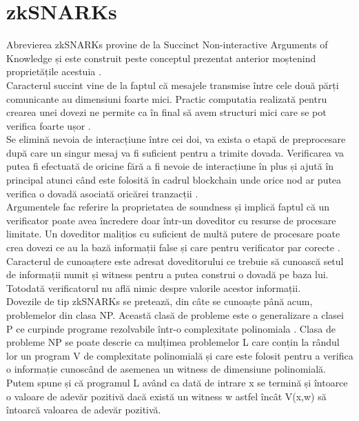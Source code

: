 \section{zkSNARKs}

Abrevierea zkSNARKs provine de la Succinct Non-interactive Arguments of Knowledge și este construit peste conceptul prezentat anterior moștenind proprietățile acestuia \cite{ZKS_Crypto_Basic2}.\\

Caracterul succint vine de la faptul că mesajele transmise între cele două părți comunicante au dimensiuni foarte mici. Practic computatia realizată pentru crearea unei dovezi ne permite ca în final să avem structuri mici care se pot verifica foarte ușor \cite{ZKS_Crypto_Basic2}. \\

Se elimină nevoia de interacțiune între cei doi, va exista o etapă de preprocesare după care un singur mesaj va fi suficient pentru a trimite dovada. Verificarea va putea fi efectuată de oricine fără a fi nevoie de interacțiune în plus și ajută în principal atunci când este folosită în cadrul blockchain unde orice nod ar putea verifica o dovadă asociată oricărei tranzacții \cite{ZKS_Crypto_Basic2}.\\

Argumentele fac referire la proprietatea de soundness și implică faptul că un verificator poate avea încredere doar într-un doveditor cu resurse de procesare limitate. Un doveditor malițios cu suficient de multă putere de procesare poate crea dovezi ce au la bază informații false și care pentru verificator par corecte \cite{ZKS_Crypto_Basic2}.\\

Caracterul de cunoaștere este adresat doveditorului ce trebuie să cunoască setul de informații numit și witness pentru a putea construi o dovadă pe baza lui. Totodată verificatorul nu află nimic despre valorile acestor informații.\\

Dovezile de tip zkSNARKs se pretează, din câte se cunoaște până acum, problemelor din clasa NP. Această clasă de probleme este o generalizare a clasei P ce curpinde programe rezolvabile într-o complexitate polinomiala \cite{ZKS_Crypto_Basic2}. Clasa de probleme NP se poate descrie ca mulțimea problemelor L care conțin la rândul lor un program V de complexitate polinomială și care este folosit pentru a verifica o informație cunoscând de asemenea un witness de dimensiune polinomială. Putem spune și că programul L având ca dată de intrare x se termină și întoarce o valoare de adevăr pozitivă dacă există un witness w astfel încât V(x,w) să întoarcă valoarea de adevăr pozitivă. \\

